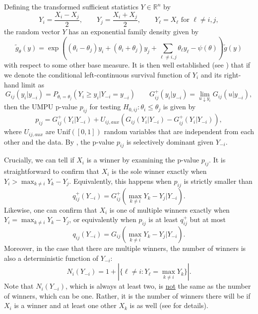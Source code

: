\documentclass{article}
\newcommand{\R}{\mathbb{R}}
\begin{document}
Defining the transformed sufficient statistics $Y \in \R^n$ by
\begin{equation}
    \label{eq:reparam}
    Y_i = \frac{X_i - X_j}{2}, \qquad  Y_j = \frac{X_i + X_j}{2}, \qquad  Y_{\ell} = X_{\ell} \text{ for } \ell \neq i, j,
\end{equation}
the random vector $Y$ has an exponential family density given by
\begin{equation}
    \tilde{g}_{\theta}(y) = \exp\left( (\theta_i - \theta_j) y_i + (\theta_i + \theta_j) y_j + \sum_{\ell \neq i, j} \theta_{\ell} y_{\ell} - \psi(\theta)  \right)\tilde{g}(y)
\end{equation}
with respect to some other base measure. It is then well established (see ) that if we denote the conditional left-continuous survival function of $Y_i$ and its right-hand limit as
\begin{equation}
    G_{ij}(y_i | y_{-i}) = P_{\theta_i = \theta_j}(Y_i \geq y_i | Y_{-i} = y_{-i}) \qquad G_{ij}^+(y_i |y_{-i}) = \lim_{u \downarrow y_i } G_{ij}(u | y_{-i}),
\end{equation}
then the UMPU p-value $p_{ij}$ for testing $H_{0, ij}: \theta_i \leq \theta_j$ is given by 
\begin{equation}
    \label{eq:umpu_rank_verification}
    p_{ij} = G^+_{ij}(Y_i | Y_{-i}) + U_{ij, aux}(G_{ij}(Y_{i}|Y_{-i}) - G^+_{ij}(Y_i|Y_{-i})),
\end{equation}
where $U_{ij, aux}$ are $\text{Unif}([0, 1])$ random variables that are independent from each other and the data. By , the p-value $p_{ij}$ is selectively dominant given $Y_{-i}$. 

Crucially, we can tell if $X_i$ is a winner by examining the p-value $p_{ij}$. It is straightforward to confirm that $X_i$ is the sole winner exactly when $Y_i > \max_{k \neq i } Y_k - Y_j $. Equivalently, this happens when $p_{ij}$ is strictly smaller than 
\begin{equation}
    \label{eq:rank_verification_lower}
    q^+_{ij}(Y_{-i}) = G^+_{ij}(\max_{k \neq i} Y_k - Y_j | Y_{-i}).
\end{equation}
Likewise, one can confirm that $X_i$ is one of multiple winners exactly when $Y_i = \max_{k \neq i } Y_k - Y_j$, or equivalently when $p_{ij}$ is at least $q^+_{ij}$ but at most 
\begin{equation}
    \label{eq:rank_verification_upper}
    q_{ij}(Y_{-i}) = G_{ij}(\max_{k \neq i} Y_k - Y_j | Y_{-i}).
\end{equation}
Moreover, in the case that there are multiple winners, the number of winners is also a deterministic function of $Y_{-i}$:
\begin{equation}
    \label{eq:rank_verification_num_ties}
    N_{i}(Y_{-i}) = 1 + | \{ \ell \neq i : Y_{\ell} = \max_{k \neq i} Y_k  \} |.
\end{equation}
Note that $N_{i}(Y_{-i})$, which is always at least two, is \underline{not} the same as the number of winners, which can be one. Rather, it is the number of winners there will be if $X_i$ is a winner and at least one other $X_k$ is as well (see  for details).  
\end{document}
